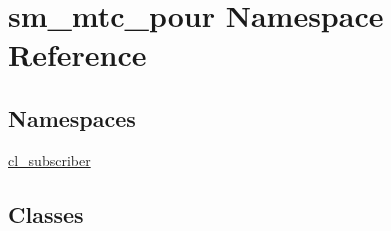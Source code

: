 \hypertarget{namespacesm__mtc__pour}{}\section{sm\+\_\+mtc\+\_\+pour Namespace Reference}
\label{namespacesm__mtc__pour}
\subsection*{Namespaces}
\begin{DoxyCompactItemize}
\item 
 \hyperlink{namespacesm__mtc__pour_1_1cl__subscriber}{cl\+\_\+subscriber}
\end{DoxyCompactItemize}
\subsection*{Classes}
